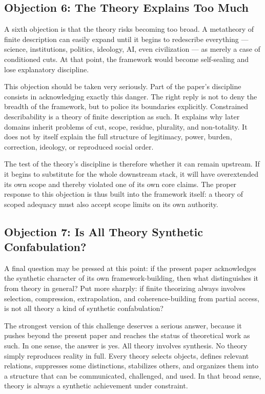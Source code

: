 \documentclass[11pt]{article}
\begin{document}
\subsection{Objection 6: The Theory Explains Too Much}

A sixth objection is that the theory risks becoming too broad. A metatheory of finite description can easily expand until it begins to redescribe everything --- science, institutions, politics, ideology, AI, even civilization --- as merely a case of conditioned cuts. At that point, the framework would become self-sealing and lose explanatory discipline.

This objection should be taken very seriously. Part of the paper's discipline consists in acknowledging exactly this danger. The right reply is not to deny the breadth of the framework, but to police its boundaries explicitly. Constrained describability is a theory of finite description as such. It explains why later domains inherit problems of cut, scope, residue, plurality, and non-totality. It does not by itself explain the full structure of legitimacy, power, burden, correction, ideology, or reproduced social order.

The test of the theory's discipline is therefore whether it can remain upstream. If it begins to substitute for the whole downstream stack, it will have overextended its own scope and thereby violated one of its own core claims. The proper response to this objection is thus built into the framework itself: a theory of scoped adequacy must also accept scope limits on its own authority.

\subsection{Objection 7: Is All Theory Synthetic Confabulation?}

A final question may be pressed at this point: if the present paper acknowledges the synthetic character of its own framework-building, then what distinguishes it from theory in general? Put more sharply: if finite theorizing always involves selection, compression, extrapolation, and coherence-building from partial access, is not all theory a kind of synthetic confabulation?

The strongest version of this challenge deserves a serious answer, because it pushes beyond the present paper and reaches the status of theoretical work as such. In one sense, the answer is yes. All theory involves synthesis. No theory simply reproduces reality in full. Every theory selects objects, defines relevant relations, suppresses some distinctions, stabilizes others, and organizes them into a structure that can be communicated, challenged, and used. In that broad sense, theory is always a synthetic achievement under constraint.
\end{document}
